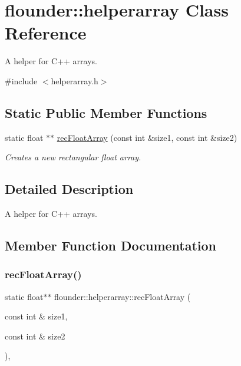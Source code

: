 \hypertarget{classflounder_1_1helperarray}{}\section{flounder\+:\+:helperarray Class Reference}
\label{classflounder_1_1helperarray}


A helper for C++ arrays.  




{\ttfamily \#include $<$helperarray.\+h$>$}

\subsection*{Static Public Member Functions}
\begin{DoxyCompactItemize}
\item 
static float $\ast$$\ast$ \hyperlink{classflounder_1_1helperarray_a0a0bb008d5879a1f43eb87efbc30971b}{rec\+Float\+Array} (const int \&size1, const int \&size2)
\begin{DoxyCompactList}\small\item\em Creates a new rectangular float array. \end{DoxyCompactList}\end{DoxyCompactItemize}


\subsection{Detailed Description}
A helper for C++ arrays. 



\subsection{Member Function Documentation}
\mbox{\label{classflounder_1_1helperarray_a0a0bb008d5879a1f43eb87efbc30971b}} 
\subsubsection{\texorpdfstring{rec\+Float\+Array()}{recFloatArray()}}
{\footnotesize\ttfamily static float$\ast$$\ast$ flounder\+::helperarray\+::rec\+Float\+Array (\begin{DoxyParamCaption}\item[{const int \&}]{size1,  }\item[{const int \&}]{size2 }\end{DoxyParamCaption})\hspace{0.3cm}{\ttfamily [inline]}, {\ttfamily [static]}}



